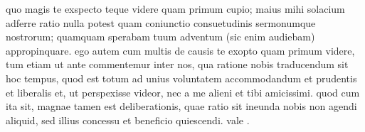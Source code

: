  quo magis te exspecto teque videre quam primum cupio; maius mihi solacium adferre ratio nulla potest quam coniunctio consuetudinis sermonumque nostrorum; quamquam sperabam tuum adventum (sic enim audiebam) appropinquare. ego autem cum multis de causis te exopto quam primum videre, tum etiam ut ante commentemur inter nos, qua ratione nobis traducendum sit hoc tempus, quod est totum ad unius voluntatem accommodandum et prudentis et liberalis et, ut perspexisse videor, nec a me alieni et tibi amicissimi. quod cum ita sit, magnae tamen est deliberationis, quae ratio sit ineunda nobis non agendi aliquid, sed illius concessu et beneficio quiescendi. vale .
